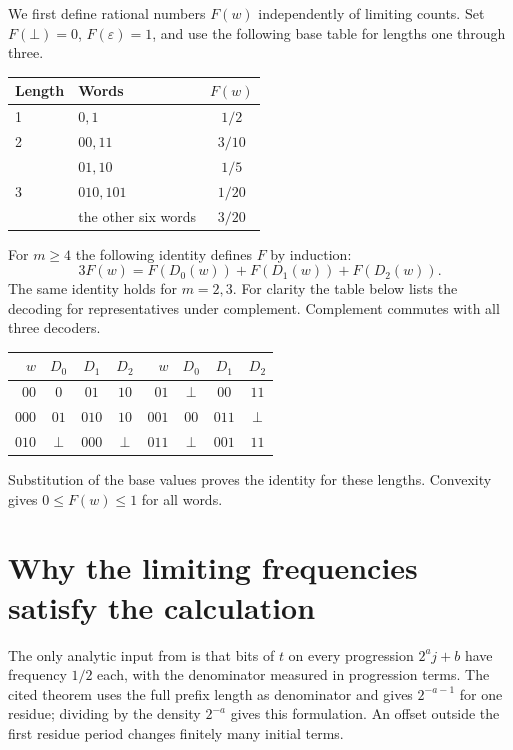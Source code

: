 \documentclass[11pt]{article}
\begin{document}
We first define rational numbers $F(w)$ independently of limiting counts. Set $F(\bot)=0$,
$F(\varepsilon)=1$, and use the following base table for lengths one through three.
\begin{center}
\begin{tabular}{llc}
\toprule
Length & Words & $F(w)$\\
\midrule
1 & $0,1$ & $1/2$\\
2 & $00,11$ & $3/10$\\
  & $01,10$ & $1/5$\\
3 & $010,101$ & $1/20$\\
  & the other six words & $3/20$\\
\bottomrule
\end{tabular}
\end{center}
For $m\ge4$ the following identity defines $F$ by induction:
\begin{equation}
                3F(w)=F(D_0(w))+F(D_1(w))+F(D_2(w)).\label{eq:transfer}
\end{equation}
The same identity holds for $m=2,3$. For clarity the table below lists the decoding for
representatives under complement. Complement commutes with all three decoders.
\begin{center}
\begin{tabular}{rccc@{\qquad}rccc}
\toprule
$w$ & $D_0$ & $D_1$ & $D_2$ &$w$ & $D_0$ & $D_1$ & $D_2$\\
\midrule
$00$ & $0$ & $01$ & $10$ & $01$ & $\bot$ & $00$ & $11$\\
$000$ & $01$ & $010$ & $10$ & $001$ & $00$ & $011$ & $\bot$\\
$010$ & $\bot$ & $000$ & $\bot$ & $011$ & $\bot$ & $001$ & $11$\\
\bottomrule
\end{tabular}
\end{center}
Substitution of the base values proves the identity for these lengths.
Convexity gives $0\le F(w)\le1$ for all words.

\section{Why the limiting frequencies satisfy the calculation}
The only analytic input from \cite[Theorem 18]{cers} is that bits of $t$ on every progression
$2^a j+b$ have frequency $1/2$ each, with the denominator measured in progression terms.
The cited theorem uses the full prefix length as denominator and gives $2^{-a-1}$ for one
residue; dividing by the density $2^{-a}$ gives this formulation. An offset outside the
first residue period changes finitely many initial terms.
\end{document}
